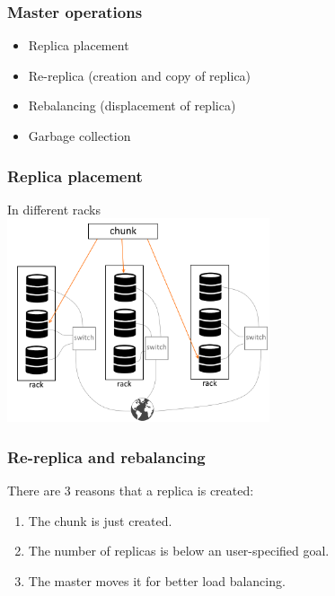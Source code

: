 \documentclass{beamer}
\begin{document}
\begin{frame}
 \frametitle{Master operations}
 \begin{itemize}
  \item \alert{Replica placement}
  \item \alert{Re-replica} (creation and copy of replica)
  \item \alert{Rebalancing} (displacement of replica)
  \item \alert{Garbage collection}
 \end{itemize}
\end{frame}

\begin{frame}
 \frametitle{Replica placement}
 In different racks\\\vspace{0.3cm}
 \centering
 \includegraphics[height=6cm]{figures/racksschema.png}
\end{frame}

\begin{frame}
 \frametitle{Re-replica and rebalancing}
 There are 3 reasons that a replica is created:
 \begin{enumerate}
  \item The chunk is just created.
  \item The number of replicas is below an user-specified goal.
  \item The master moves it for better load balancing.
 \end{enumerate}
\end{frame}
\end{document}
